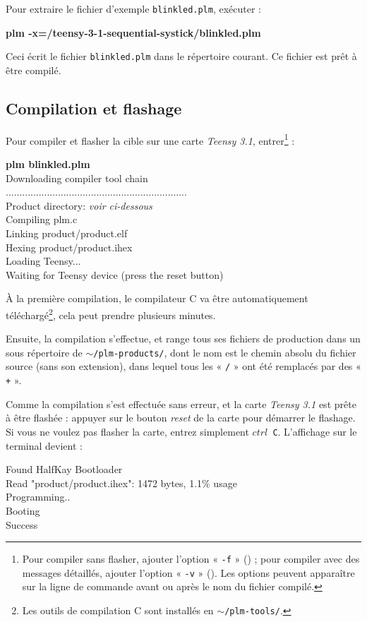 Pour extraire le fichier d'exemple \texttt{blinkled.plm}, exécuter :

\begin{SHELL}
\bfseries plm -x=/teensy-3-1-sequential-systick/blinkled.plm
\end{SHELL}


Ceci écrit le fichier \texttt{blinkled.plm} dans le répertoire courant. Ce fichier est prêt à être compilé.

\subsection{Compilation et flashage}

Pour compiler et flasher la cible sur une carte \emph{Teensy 3.1}, entrer\footnote{Pour compiler sans flasher, ajouter l'option « \texttt{-f} » () ; pour compiler avec des messages détaillés, ajouter l'option « \texttt{-v} » (). Les options peuvent apparaître sur la ligne de commande avant ou après le nom du fichier compilé.} :
\begin{SHELL}
{\bfseries plm blinkled.plm}\\
Downloading compiler tool chain\\
..................................................................\\
Product directory: \emph{voir ci-dessous}\\
Compiling plm.c\\
Linking product/product.elf\\
Hexing product/product.ihex\\
Loading Teensy...\\
Waiting for Teensy device (press the reset button)
\end{SHELL}

À la première compilation, le compilateur C va être automatiquement téléchargé\footnote{Les outils de compilation C sont installés en \texttt{$\sim$/plm-tools/}.}, cela peut prendre plusieurs minutes.

Ensuite, la compilation s'effectue, et range tous ses fichiers de production dans un sous répertoire de \texttt{$\sim$/plm-products/}, dont le nom est le  chemin absolu du fichier source (sans son extension), dans lequel tous les « \texttt{/} » ont été remplacés par des « \texttt{+} ».

Comme la compilation s'est effectuée sans erreur, et la carte \emph{Teensy 3.1} est prête à être flashée : appuyer sur le bouton \emph{reset} de la carte pour démarrer le flashage. Si vous ne voulez pas flasher la carte, entrez simplement \texttt{$ctrl$~C}. L'affichage sur le terminal devient :
\begin{SHELL}
Found HalfKay Bootloader\\
Read "product/product.ihex": 1472 bytes, 1.1\% usage\\
Programming..\\
Booting\\
Success
\end{SHELL}

